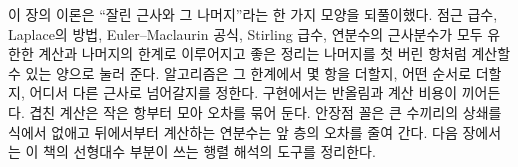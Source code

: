 이 장의 이론은 ``잘린 근사와 그 나머지''라는 한 가지 모양을 되풀이했다. 점근 급수, Laplace의 방법, Euler--Maclaurin 공식, Stirling 급수, 연분수의 근사분수가 모두 유한한 계산과 나머지의 한계로 이루어지고 좋은 정리는 나머지를 첫 버린 항처럼 계산할 수 있는 양으로 눌러 준다. 알고리즘은 그 한계에서 몇 항을 더할지, 어떤 순서로 더할지, 어디서 다른 근사로 넘어갈지를 정한다. 구현에서는 반올림과 계산 비용이 끼어든다. 겹친 계산은 작은 항부터 모아 오차를 묶어 둔다. 안장점 꼴은 큰 수끼리의 상쇄를 식에서 없애고 뒤에서부터 계산하는 연분수는 앞 층의 오차를 줄여 간다. 다음 장에서는 이 책의 선형대수 부분이 쓰는 행렬 해석의 도구를 정리한다.

\chapterreferences
